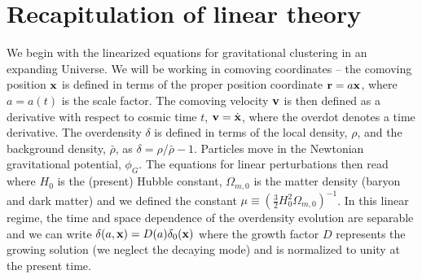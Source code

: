 \section{Recapitulation of linear theory}
We begin with the linearized equations for gravitational clustering in an expanding Universe. We will be working in comoving coordinates -- the comoving position $\mathbf x$ is defined in terms of the proper position coordinate $\mathbf r = a\mathbf x$, where $a=a(t)$ is the scale factor. The comoving velocity $\mathbf v$ is then defined as a derivative with respect to cosmic time $t$, $\mathbf v = \dot{\mathbf x}$, where the overdot denotes a time derivative. The overdensity $\delta$ is defined in terms of the local density, $\rho$, and the background density, $\bar\rho$,  as $\delta=\rho/\bar\rho-1$. Particles move in the Newtonian gravitational potential, $\phi_G$. The equations for linear perturbations then read
where $H_0$ is the (present) Hubble constant, $\Omega_{m, 0}$ is the matter density (baryon and dark matter) and we defined the constant $\mu\equiv\left(\frac32 H_0^2\Omega_{m, 0}\right)^{-1}$. In this linear regime, the time and space dependence of the overdensity evolution are separable and we can write $\delta(a, \mathbf x)=D(a)\delta_0(\mathbf x)$ where the growth factor $D$ represents the growing solution (we neglect the decaying mode) and is normalized to unity at the present time.

